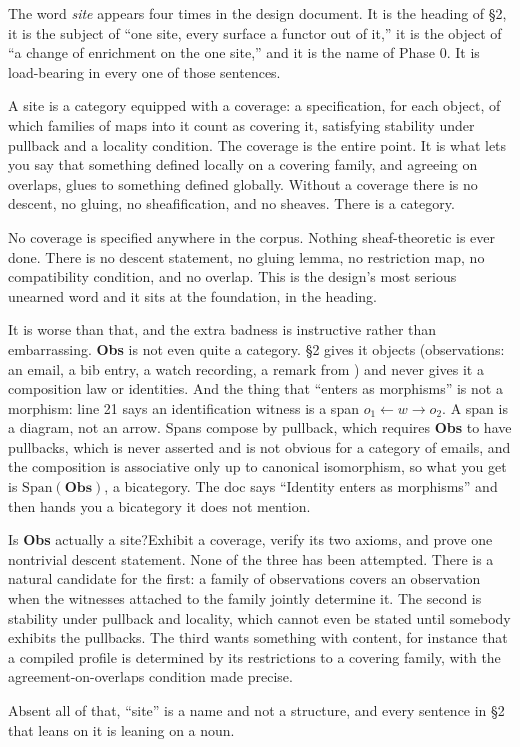 The word \emph{site} appears four times in the design document. It is the heading of \S2, it is the subject of ``one site, every surface a functor out of it,'' it is the object of ``a change of enrichment on the one site,'' and it is the name of Phase 0. It is load-bearing in every one of those sentences.

A site is a category equipped with a coverage: a specification, for each object, of which families of maps into it count as covering it, satisfying stability under pullback and a locality condition. The coverage is the entire point. It is what lets you say that something defined locally on a covering family, and agreeing on overlaps, glues to something defined globally. Without a coverage there is no descent, no gluing, no sheafification, and no sheaves. There is a category.

No coverage is specified anywhere in the corpus. Nothing sheaf-theoretic is ever done. There is no descent statement, no gluing lemma, no restriction map, no compatibility condition, and no overlap. This is the design's most serious unearned word and it sits at the foundation, in the heading.

It is worse than that, and the extra badness is instructive rather than embarrassing. \textbf{Obs} is not even quite a category. \S2 gives it objects (observations: an email, a bib entry, a watch recording, a remark from \labColleague) and never gives it a composition law or identities. And the thing that ``enters as morphisms'' is not a morphism: line 21 says an identification witness is a span $o_1 \leftarrow w \to o_2$. A span is a diagram, not an arrow. Spans compose by pullback, which requires \textbf{Obs} to have pullbacks, which is never asserted and is not obvious for a category of emails, and the composition is associative only up to canonical isomorphism, so what you get is $\mathrm{Span}(\mathbf{Obs})$, a bicategory. The doc says ``Identity enters as morphisms'' and then hands you a bicategory it does not mention.

\begin{Open}{Is \textbf{Obs} actually a site?}{Exhibit a coverage, verify its two axioms, and prove one nontrivial descent statement.}
None of the three has been attempted. There is a natural candidate for the first: a family of observations covers an observation when the witnesses attached to the family jointly determine it. The second is stability under pullback and locality, which cannot even be stated until somebody exhibits the pullbacks. The third wants something with content, for instance that a compiled profile is determined by its restrictions to a covering family, with the agreement-on-overlaps condition made precise.

Absent all of that, ``site'' is a name and not a structure, and every sentence in \S2 that leans on it is leaning on a noun.
\end{Open}

